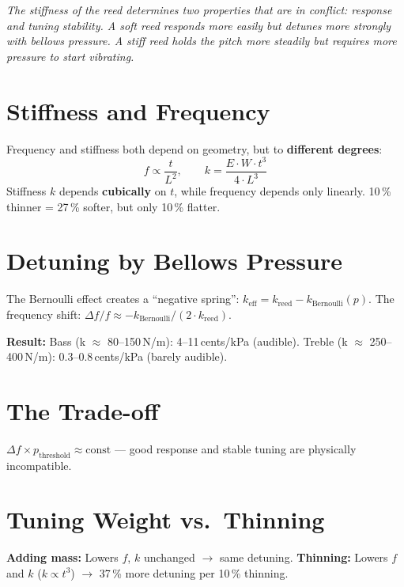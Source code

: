 \documentclass[11pt,a4paper]{article}
\begin{document}
\hbmaketitle

{\small\itshape The stiffness of the reed determines two properties that are in conflict: response and tuning stability. A soft reed responds more easily but detunes more strongly with bellows pressure. A stiff reed holds the pitch more steadily but requires more pressure to start vibrating.}

\section{Stiffness and Frequency}

Frequency and stiffness both depend on geometry, but to \textbf{different degrees}:
\begin{equation}
f \propto \frac{t}{L^2}, \qquad k = \frac{E \cdot W \cdot t^3}{4 \cdot L^3}
\end{equation}
Stiffness $k$ depends \textbf{cubically} on $t$, while frequency depends only linearly. 10\,\% thinner = 27\,\% softer, but only 10\,\% flatter.

\section{Detuning by Bellows Pressure}

The Bernoulli effect creates a ``negative spring'': $k_\text{eff} = k_\text{reed} - k_\text{Bernoulli}(p)$. The frequency shift: $\Delta f/f \approx -k_\text{Bernoulli}/(2 \cdot k_\text{reed})$.

\begin{keybox}
\textbf{Result:} Bass (k $\approx$ 80--150\,N/m): 4--11\,cents/kPa (audible). Treble (k $\approx$ 250--400\,N/m): 0.3--0.8\,cents/kPa (barely audible).
\end{keybox}

\section{The Trade-off}

$\Delta f \times p_\text{threshold} \approx \text{const}$ --- good response and stable tuning are physically incompatible.

\section{Tuning Weight vs.\ Thinning}

\textbf{Adding mass:} Lowers $f$, $k$ unchanged $\to$ same detuning. \textbf{Thinning:} Lowers $f$ and $k$ ($k \propto t^3$) $\to$ 37\,\% more detuning per 10\,\% thinning.
\end{document}
